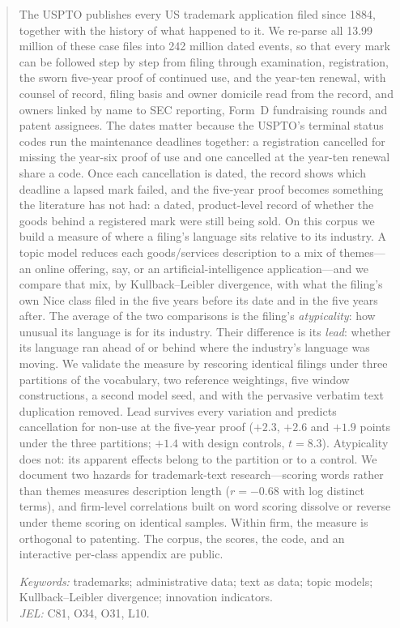 \begin{abstract}
\noindent The USPTO publishes every US trademark application filed since
1884, together with the history of what happened to it. We re-parse all
13.99 million of these case files into 242 million dated events, so that
every mark can be followed step by step from filing through examination,
registration, the sworn five-year proof of continued use, and the
year-ten renewal, with counsel of record, filing basis and owner domicile
read from the record, and owners linked by name to SEC reporting,
Form~D fundraising rounds and patent assignees. The dates matter because
the USPTO's terminal status codes run the maintenance deadlines together:
a registration cancelled for missing the year-six proof of use and one
cancelled at the year-ten renewal share a code. Once each cancellation is
dated, the record shows which deadline a lapsed mark failed, and the
five-year proof becomes something the literature has not had: a dated,
product-level record of whether the goods behind a registered mark were
still being sold. On this corpus we build a measure of where a filing's
language sits relative to its industry. A topic model reduces each
goods/services description to a mix of themes---an online offering, say,
or an artificial-intelligence application---and we compare that mix, by
Kullback--Leibler divergence, with what the filing's own Nice class filed
in the five years before its date and in the five years after. The
average of the two comparisons is the filing's \emph{atypicality}: how
unusual its language is for its industry. Their difference is its
\emph{lead}: whether its language ran ahead of or behind where the
industry's language was moving. We validate the measure by rescoring
identical filings under three partitions of the vocabulary, two reference
weightings, five window constructions, a second model seed, and with the
pervasive verbatim text duplication removed. Lead survives every
variation and predicts cancellation for non-use at the five-year proof
($+2.3$, $+2.6$ and $+1.9$ points under the three partitions; $+1.4$ with
design controls, $t = 8.3$). Atypicality does not: its apparent effects
belong to the partition or to a control. We document two hazards for
trademark-text research---scoring words rather than themes measures
description length ($r = -0.68$ with log distinct terms), and firm-level
correlations built on word scoring dissolve or reverse under theme
scoring on identical samples. Within firm, the measure is orthogonal to
patenting. The corpus, the scores, the code, and an interactive per-class
appendix are public.

\medskip
\noindent\emph{Keywords:} trademarks; administrative data; text as data;
topic models; Kullback--Leibler divergence; innovation indicators.\\
\emph{JEL:} C81, O34, O31, L10.
\end{abstract}
